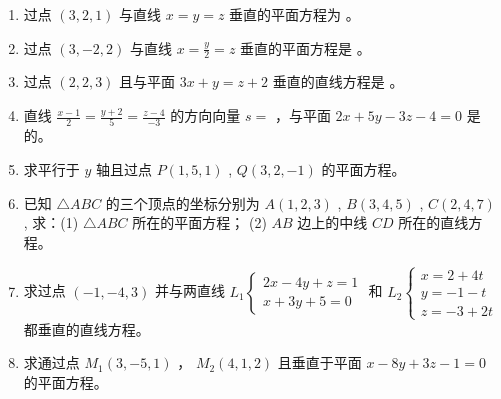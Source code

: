 \documentclass[12pt, a4paper]{article}
\newcommand{\blank}[1]{\underline{\hspace{#1}}}
\begin{document}
\begin{enumerate}
    \item 过点 $ (3,2,1) $ 与直线 $ x = y = z $ 垂直的平面方程为 \blank{2cm}。

    \item 过点 $ (3,-2,2) $ 与直线 $ x=\frac{y}{2}=z $ 垂直的平面方程是 \blank{2cm}。

    \item 过点 $ (2,2,3) $ 且与平面 $ 3x + y = z + 2 $ 垂直的直线方程是 \blank{2cm}。

    \item 直线 $ \frac{x-1}{2} = \frac{y+2}{5} = \frac{z-4}{-3} $ 的方向向量 $s=$ \blank{1.5cm}，与平面 $ 2x + 5y - 3z - 4 = 0 $ 是 \blank{1.5cm} 的。

    \item 求平行于 $y$ 轴且过点 $ P(1,5,1) $ , $ Q(3,2,-1) $ 的平面方程。

    \item 已知 $ \triangle ABC $ 的三个顶点的坐标分别为 $ A(1,2,3) $ , $ B(3,4,5) $ , $ C(2,4,7) $ ,
    求：(1) $ \triangle ABC $ 所在的平面方程；
    (2) $AB$ 边上的中线 $CD$ 所在的直线方程。

    \item 求过点 $ (-1,-4,3) $ 并与两直线 $ L_{1}\begin{cases}2x-4y+z=1\\ x+3y+5=0\end{cases} $ 和 $ L_{2}\begin{cases}x=2+4t\\ y=-1-t\\ z=-3+2t\end{cases} $ 都垂直的直线方程。

    \item 求通过点 $ M_{1}(3,-5,1) $ ， $ M_{2}(4,1,2) $ 且垂直于平面 $ x-8y+3z-1=0 $ 的平面方程。
\end{enumerate}
\end{document}
